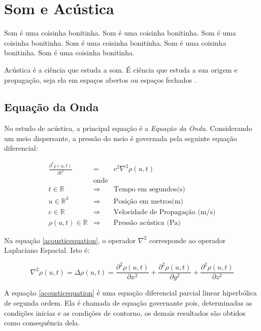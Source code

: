 \section{Som e Acústica}

Som é uma coisinha bonitinha.
Som é uma coisinha bonitinha.
Som é uma coisinha bonitinha.
Som é uma coisinha bonitinha.
Som é uma coisinha bonitinha.
Som é uma coisinha bonitinha.

Acústica é a ciência que estuda a som. É ciência que estuda a sua origem e propagação, seja ela em espaços abertos ou espaços fechados \cite{kuttruff2007acoustics}.

\subsection{Equação da Onda}

No estudo de acústica, a principal equação é a \emph{Equação da Onda}. Considerando um meio dispersante, a pressão do meio é governada pela seguinte equação diferencial:

\begin{eqnarray}
\frac{\partial^2 \rho(u, t)}{\partial t^2} &=& c^2 \nabla^2 \rho(u, t)\label{acousticequation} \\
&\text{onde}&\nonumber\\
t \in \mathbb{R} &\Rightarrow& \text{Tempo em segundos(s)} \nonumber\\
u \in \mathbb{R}^3 &\Rightarrow& \text{Posição em metros(m)} \nonumber\\
c \in \mathbb{R} &\Rightarrow& \text{Velocidade de Propagação (m/s)} \nonumber\\
\rho(u, t) \in \mathbb{R} &\Rightarrow& \text{Pressão acústica (Pa)} \nonumber
\end{eqnarray}

Na equação \eqref{acousticequation}, o operador $\nabla^2$ corresponde ao operador Laplaciano Espacial. Isto é:

\begin{equation}
	\nabla^2 \rho(u, t) = \Delta \rho(u, t) = \frac{\partial^2 \rho(u, t)}{\partial x^2} + \frac{\partial^2 \rho(u, t)}{\partial y^2} + \frac{\partial^2 \rho(u, t)}{\partial z^2}
\end{equation}

A equação \eqref{acousticequation} é uma equação diferencial parcial linear hiperbólica de segunda ordem. Ela é chamada de equação governante pois, determinadas as condições inicias e as condições de contorno, os demais resultados são obtidos como consequência dela.

